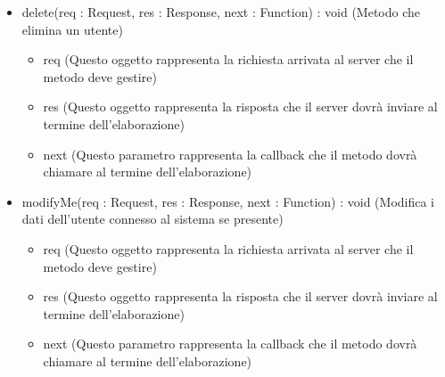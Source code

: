 \begin{description}
\begin{itemize}
\item delete(req : Request, res : Response, next : Function) : void (Metodo che elimina un utente)\begin{itemize}
\item req (Questo oggetto rappresenta la richiesta arrivata al server che il metodo deve gestire)
\item res (Questo oggetto rappresenta la risposta che il server dovrà inviare al termine dell'elaborazione)
\item next (Questo parametro rappresenta la callback che il metodo dovrà chiamare al termine dell’elaborazione)
\end{itemize}

\item modifyMe(req : Request, res : Response, next : Function) : void (Modifica i dati dell'utente connesso al sistema se presente)\begin{itemize}
\item req (Questo oggetto rappresenta la richiesta arrivata al server che il metodo deve gestire)
\item res (Questo oggetto rappresenta la risposta che il server dovrà inviare al termine dell'elaborazione)
\item next (Questo parametro rappresenta la callback che il metodo dovrà chiamare al termine dell’elaborazione)
\end{itemize}

\end{itemize}

\end{description}

\vspace{0.5cm}
\hypertarget{server::service::QuestionnaireService}{}
